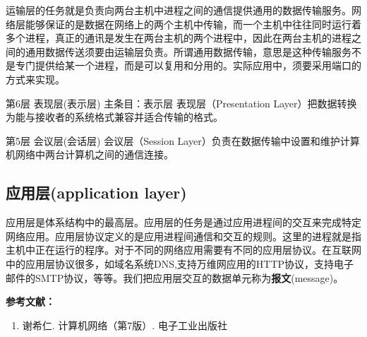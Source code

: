 运输层的任务就是负责向两台主机中进程之间的通信提供通用的数据传输服务。网络层能够保证的是数据在网络上的两个主机中传输，而一个主机中往往同时运行着多个进程，真正的通讯是发生在两台主机的两个进程中，因此在两台主机的进程之间的通用数据传送须要由运输层负责。所谓通用数据传输，意思是这种传输服务不是专门提供给某一个进程，而是可以复用和分用的。实际应用中，须要采用端口的方式来实现。

第6层 表现层(表示层)
主条目：表示层
表现层（Presentation Layer）把数据转换为能与接收者的系统格式兼容并适合传输的格式。

第5层 会议层(会话层)
会议层（Session Layer）负责在数据传输中设置和维护计算机网络中两台计算机之间的通信连接。


\subsection{应用层(application layer)}

应用层是体系结构中的最高层。应用层的任务是通过应用进程间的交互来完成特定网络应用。应用层协议定义的是应用进程间通信和交互的规则。这里的进程就是指主机中正在运行的程序。对于不同的网络应用需要有不同的应用层协议。在互联网中的应用层协议很多，如域名系统DNS,支持万维网应用的HTTP协议，支持电子邮件的SMTP协议，等等。我们把应用层交互的数据单元称为\textbf{报文}(message)。




\textbf{参考文献：}
\begin{enumerate}
\item 谢希仁. 计算机网络（第7版）. 电子工业出版社
\end{enumerate}
